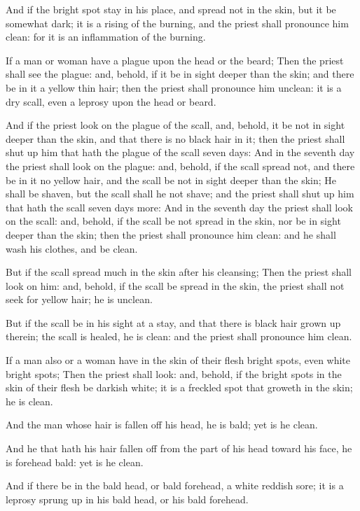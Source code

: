 \Verse And if the bright spot stay in his place, and spread not in the skin, but it be somewhat dark; it is a rising of the burning, and the priest shall pronounce him clean: for it is an inflammation of the burning.

\Verse If a man or woman have a plague upon the head or the beard; \Verse Then the priest shall see the plague: and, behold, if it be in sight deeper than the skin; and there be in it a yellow thin hair; then the priest shall pronounce him unclean: it is a dry scall, even a leprosy upon the head or beard.

\Verse And if the priest look on the plague of the scall, and, behold, it be not in sight deeper than the skin, and that there is no black hair in it; then the priest shall shut up him that hath the plague of the scall seven days: \Verse And in the seventh day the priest shall look on the plague: and, behold, if the scall spread not, and there be in it no yellow hair, and the scall be not in sight deeper than the skin; \Verse He shall be shaven, but the scall shall he not shave; and the priest shall shut up him that hath the scall seven days more: \Verse And in the seventh day the priest shall look on the scall: and, behold, if the scall be not spread in the skin, nor be in sight deeper than the skin; then the priest shall pronounce him clean: and he shall wash his clothes, and be clean.

\Verse But if the scall spread much in the skin after his cleansing; \Verse Then the priest shall look on him: and, behold, if the scall be spread in the skin, the priest shall not seek for yellow hair; he is unclean.

\Verse But if the scall be in his sight at a stay, and that there is black hair grown up therein; the scall is healed, he is clean: and the priest shall pronounce him clean.

\Verse If a man also or a woman have in the skin of their flesh bright spots, even white bright spots; \Verse Then the priest shall look: and, behold, if the bright spots in the skin of their flesh be darkish white; it is a freckled spot that groweth in the skin; he is clean.

\Verse And the man whose hair is fallen off his head, he is bald; yet is he clean.

\Verse And he that hath his hair fallen off from the part of his head toward his face, he is forehead bald: yet is he clean.

\Verse And if there be in the bald head, or bald forehead, a white reddish sore; it is a leprosy sprung up in his bald head, or his bald forehead.


